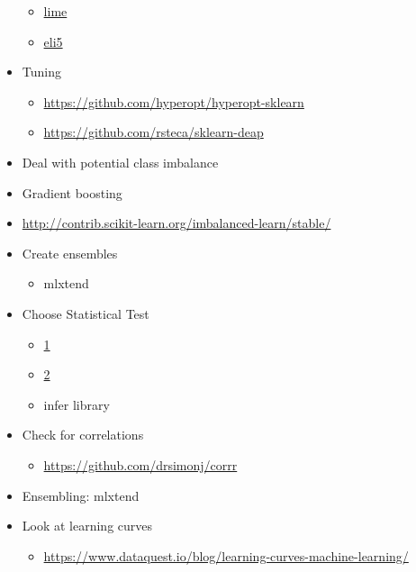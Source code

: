 \documentclass[]{book}
\providecommand{\tightlist}{%
  \setlength{\itemsep}{0pt}\setlength{\parskip}{0pt}}
\theoremstyle{definition}
\theoremstyle{definition}
\theoremstyle{definition}
\theoremstyle{remark}
\begin{document}
\begin{itemize}
  \begin{itemize}
  \tightlist
  \item
    \href{https://github.com/marcotcr/lime}{lime}
  \item
    \href{https://github.com/TeamHG-Memex/eli5}{eli5}
  \end{itemize}
\item
  Tuning

  \begin{itemize}
  \tightlist
  \item
    \url{https://github.com/hyperopt/hyperopt-sklearn}
  \item
    \url{https://github.com/rsteca/sklearn-deap}
  \end{itemize}
\item
  Deal with potential class imbalance
\item
  Gradient boosting
\item
  \url{http://contrib.scikit-learn.org/imbalanced-learn/stable/}
\item
  Create ensembles

  \begin{itemize}
  \tightlist
  \item
    mlxtend
  \end{itemize}
\item
  Choose Statistical Test

  \begin{itemize}
  \tightlist
  \item
    \href{http://www.ats.ucla.edu/stat/mult_pkg/whatstat/}{1}
  \item
    \href{http://www.qnamarkup.org/i/?source=http://colarusso.github.io/QnAMarkup/examples/source/WhatStats.txt}{2}
  \item
    infer library
  \end{itemize}
\item
  Check for correlations

  \begin{itemize}
  \tightlist
  \item
    \url{https://github.com/drsimonj/corrr}
  \end{itemize}
\item
  Ensembling: mlxtend
\item
  Look at learning curves

  \begin{itemize}
  \tightlist
  \item
    \url{https://www.dataquest.io/blog/learning-curves-machine-learning/}
  \end{itemize}
\end{itemize}
\end{document}
